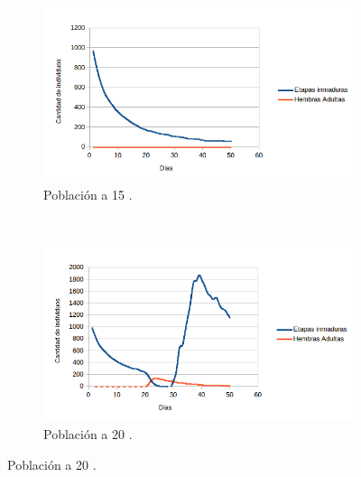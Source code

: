 \begin{figure}[!htbp]
    \centering
    \begin{subfigure}[b]{0.45\textwidth}
            \includegraphics[width=\textwidth]{capitulo-6/graphics/desarrollo-poblacion-15.png}
            \caption{\label{fig:desarrollo-poblacion-15}Población a 15 \textcelsius.}
    \end{subfigure}
    ~~~~
    \begin{subfigure}[b]{0.45\textwidth}
            \includegraphics[width=\textwidth]{capitulo-6/graphics/desarrollo-poblacion-20.png}
            \caption{\label{fig:desarrollo-poblacion-20}Población a 20 \textcelsius.}
    \end{subfigure}


\end{figure}
